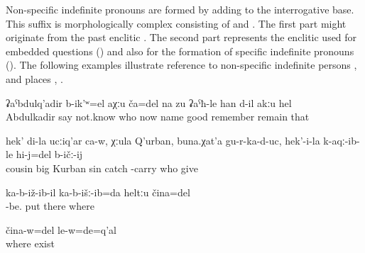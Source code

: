 Non-specific indefinite pronouns are formed by adding  to the interrogative base. This suffix is morphologically complex consisting of  and . The first part might originate from the past enclitic . The second part represents the enclitic used for embedded questions () and also for the formation of specific indefinite pronouns (). The following examples illustrate reference to non-specific indefinite persons ,  and places , .
%
\begin{exe}
	\ex	\label{ex:He was called Abdukhaliq or something (lit. somebody), I don't know, I don't remember this name well}
	\gll	ʡaˁbdulq'adir	b-ik'ʷ=el	aχːu	ča=del	na	zu	ʡaˁħ-le	han	d-il	akːu	hel\\
		Abdulkadir	say	not.know	who	now	name	good	remember	remain		that\\
	\glt	{}

	\ex	\label{ex:My cousin, Old Kurban, may his sins be relieved, brought them for me to give them to someone}
	\gll	hek'	di-la	ucːiq'ar ca-w,	χːula	Q'urban,	buna.χat'a	gu-r-ka-d-uc,		hek'-i-la	k-aqː-ib-le	hi-j=del	b-ičː-ij\\
				cousin		big	Kurban	sin	catch			-carry	who	give\\
	\glt	{}
	
	\ex	\label{ex:I put (the picture) somewhere}
	\gll	ka-b-iž-ib-il	ka-b-išː-ib=da	heltːu	čina=del\\
		-be.	put	there	where\\
	\glt	{}

	\ex	\label{ex:He was somewhere}
	\gll	čina-w=del	le-w=de=q'al\\
		where	exist\\
	\glt	{}


\end{exe}


